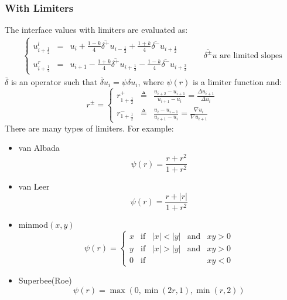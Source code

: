 \documentclass[11pt, a4paper]{article}
\begin{document}
\subsubsection{With Limiters}
The interface values with limiters are evaluated as:
\begin{equation}
    \begin{matrix}
        \left\{\begin{array}{lcl}
            u_{i+\frac{1}{2}}^l & = & u_i+\frac{1-k}{4}\overline{\delta^+} u_{i-\frac{1}{2}}+\frac{1+k}{4}\overline{\delta^-} u_{i+\frac{1}{2}} \\
            u_{i+\frac{1}{2}}^r & = & u_{i+1}-\frac{1+k}{4}\overline{\delta^+} u_{i+\frac{1}{2}}-\frac{1-k}{4}\overline{\delta^-} u_{i+\frac{3}{2}}
        \end{array}\right. && {\overline{\delta^\pm}} u\text{ are limited slopes}
    \end{matrix}
\end{equation}
$\overline{\delta}$ is an operator such that $\overline{\delta}u_i=\psi\delta u_i$, where $\psi\left(r\right)$ is a limiter function and:
\begin{equation}
    r^\pm=\left\{\begin{array}{ccc}
        r_{1+\frac{1}{2}}^+ & \triangleq & \displaystyle\frac{u_{i+2}-u_{i+1}}{u_{i+1}-u_i}=\frac{\Delta u_{i+1}}{\Delta u_i} \\
        r_{1+\frac{1}{2}}^- & \triangleq & \displaystyle\frac{u_{i}-u_{i-1}}{u_{i+1}-u_i}=\frac{\nabla u_{i}}{\nabla u_{i+1}}
    \end{array}\right.
\end{equation}
There are many types of limiters. For example:
\begin{itemize}
    \item van Albada $$\psi\left(r\right)=\frac{r+r^2}{1+r^2}$$
    \item van Leer $$\psi\left(r\right)=\frac{r+\left|r\right|}{1+r^2}$$
    \item minmod$(x,y)$ $$\psi\left(r\right)=\left\{\begin{array}{ccccc}
        x & \mathrm{if} & \left|x\right|<\left|y\right| & \mathrm{and} & xy>0 \\
        y & \mathrm{if} & \left|x\right|>\left|y\right| & \mathrm{and} & xy>0 \\
        0 & \mathrm{if} & & & xy<0 
    \end{array}\right.$$
    \item Superbee(Roe) $$\psi\left(r\right)=\max\left(0,\min\left(2r,1\right),\min\left(r,2\right)\right)$$

\end{itemize}
\end{document}
